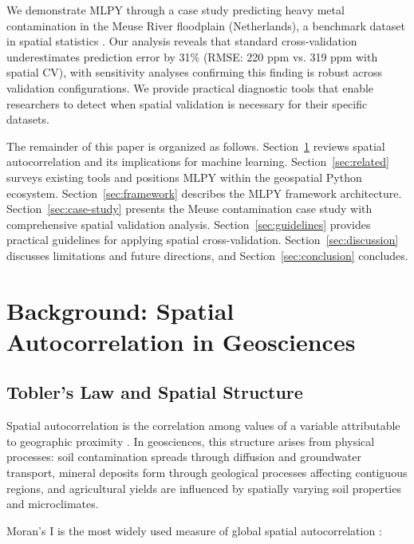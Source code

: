 \documentclass[a4paper,fleqn]{cas-sc}
\begin{document}
We demonstrate MLPY through a case study predicting heavy metal contamination in the Meuse River floodplain (Netherlands), a benchmark dataset in spatial statistics \citep{rikken1996geostatistics}. Our analysis reveals that standard cross-validation underestimates prediction error by 31\% (RMSE: 220 ppm vs. 319 ppm with spatial CV), with sensitivity analyses confirming this finding is robust across validation configurations. We provide practical diagnostic tools that enable researchers to detect when spatial validation is necessary for their specific datasets.

The remainder of this paper is organized as follows. Section~\ref{sec:background} reviews spatial autocorrelation and its implications for machine learning. Section~\ref{sec:related} surveys existing tools and positions MLPY within the geospatial Python ecosystem. Section~\ref{sec:framework} describes the MLPY framework architecture. Section~\ref{sec:case-study} presents the Meuse contamination case study with comprehensive spatial validation analysis. Section~\ref{sec:guidelines} provides practical guidelines for applying spatial cross-validation. Section~\ref{sec:discussion} discusses limitations and future directions, and Section~\ref{sec:conclusion} concludes.


\section{Background: Spatial Autocorrelation in Geosciences}
\label{sec:background}

\subsection{Tobler's Law and Spatial Structure}

Spatial autocorrelation is the correlation among values of a variable attributable to geographic proximity \citep{legendre1993spatial}. In geosciences, this structure arises from physical processes: soil contamination spreads through diffusion and groundwater transport, mineral deposits form through geological processes affecting contiguous regions, and agricultural yields are influenced by spatially varying soil properties and microclimates.

Moran's I is the most widely used measure of global spatial autocorrelation \citep{moran1950notes}:
\end{document}

